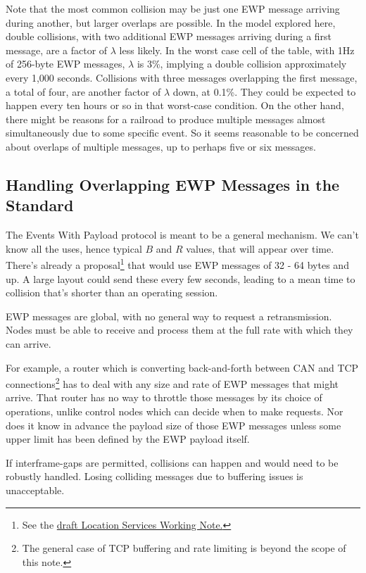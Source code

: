 \documentclass[11pt]{article}
\begin{document}
Note that the most common collision may be just one 
EWP message arriving during another, but larger overlaps are possible. 
In the model explored here,
double collisions, with two additional EWP messages arriving during a
first message, are a factor of $\lambda$ less likely.
In the worst case cell of the table, with 1Hz of 256-byte EWP messages, 
$\lambda$ is  3\%, implying a double collision approximately every 1,000 seconds. 
Collisions with three messages overlapping the first
message, a total of four, are another factor of $\lambda$ down, at 0.1\%.
They could be expected to happen every ten hours or so in that worst-case condition.
On the other hand, there might be reasons for a railroad to produce multiple
messages almost simultaneously due to some specific event.  So it seems
reasonable to be concerned about overlaps of multiple messages, 
up to perhaps five or six messages.

\subsection{Handling Overlapping EWP Messages in the Standard}\label{ewp_overlap}

The Events With Payload protocol is meant to be a general mechanism.  We
can't know all the uses, hence typical $B$ and $R$ values,
that will appear over time. 
There's already a proposal\footnote{See the 
    \href{https://github.com/openlcb/documents/pull/93}{draft Location Services Working Note.}
}
that would use EWP messages of 32 - 64 bytes and up.  A large
layout could send these every few seconds, leading to 
a mean time to collision that's shorter than an operating session.

EWP messages are global, with no general way to request a retransmission.
Nodes must be able to receive and process them at the full rate with 
which they can arrive.

For example, a router which is converting back-and-forth between CAN and
TCP connections\footnote{The general case of TCP buffering and rate limiting
    is beyond the scope of this note.} 
has to deal with any size and rate of EWP messages that might arrive. 
That router has no way to throttle those messages by its choice of operations, 
unlike control nodes which can decide when to make requests. Nor does it 
know in advance the payload size of those EWP messages unless some upper
limit has been defined by the EWP payload itself.

\cbstart
If interframe-gaps are permitted, 
collisions can happen and would need to be robustly handled.  
Losing colliding messages due to buffering issues is unacceptable.
\cbend
\end{document}
